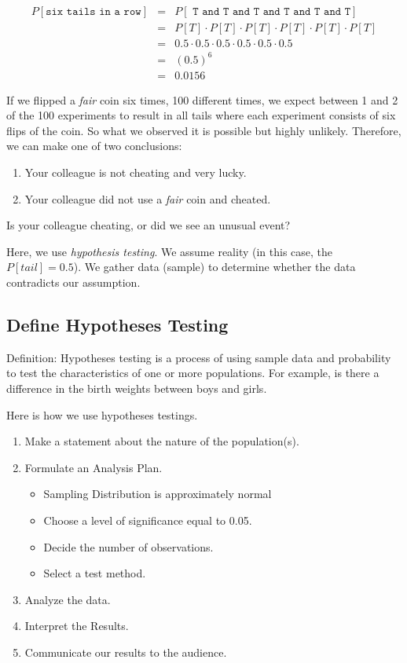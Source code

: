\documentclass[11pt, chapterprefix=true]{scrbook}\usepackage[]{graphicx}\usepackage[]{color}
\begin{document}
\begin{eqnarray*}
P[\texttt{six tails in a row}] &=& P[\texttt{ T and T and T and T and T and T} ] \\
&=& P[T] \cdot P[T] \cdot P[T] \cdot P[T] \cdot P[T] \cdot P[T] \\
&=& 0.5 \cdot 0.5 \cdot 0.5 \cdot 0.5 \cdot 0.5 \cdot 0.5 \\
&=& (0.5)^6 \\
&=& 0.0156
\end{eqnarray*}

If we flipped a \textit{fair} coin six times, 100 different times, we expect between 1 and 2 of the 100 experiments to result in all tails where each experiment consists of six flips of the coin.  So what we observed it is possible but highly unlikely.  Therefore, we can make one of two conclusions:

\begin{enumerate}
\item Your colleague is not cheating and very lucky.
\item Your colleague did not use a \textit{fair} coin and cheated.
\end{enumerate}

Is your colleague cheating, or did we see an unusual event?

Here, we use \textit{hypothesis testing}.  We assume reality (in this case, the $P[tail] = 0.5$).  We gather data (sample) to determine whether the data contradicts our assumption.

\subsection{Define Hypotheses Testing}

Definition: Hypotheses testing is a process of using sample data and probability to test the characteristics of one or more populations.  For example, is there a difference in the birth weights between boys and girls.

Here is how we use hypotheses testings.

\begin{enumerate}
\item Make a statement about the nature of the population(s).
\item Formulate an Analysis Plan. 

  \begin{itemize}
  \item Sampling Distribution is approximately normal
  \item Choose a level of significance equal to 0.05.
  \item Decide the number of observations.
  \item Select a test method.
  \end{itemize}

\item Analyze the data.
\item Interpret the Results.
\item Communicate our results to the audience.
\end{enumerate}
\end{document}
